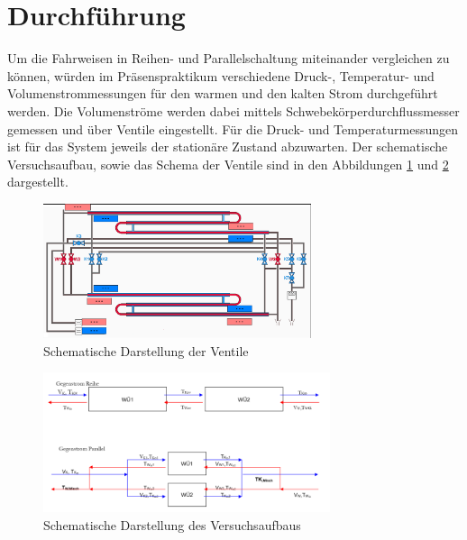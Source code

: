 
\section{Durchführung}
\label{sec:durchfuerung}

Um die Fahrweisen in Reihen- und Parallelschaltung miteinander vergleichen zu können, würden im Präsenspraktikum verschiedene Druck-, Temperatur- und Volumenstrommessungen für den warmen und den kalten Strom durchgeführt werden. Die Volumenströme werden dabei mittels Schwebekörperdurchflussmesser gemessen und über Ventile eingestellt.  Für die Druck- und Temperaturmessungen ist für das System jeweils der stationäre Zustand abzuwarten.
Der schematische Versuchsaufbau, sowie das Schema der Ventile sind in den Abbildungen \ref{fig:schema} und \ref{fig:schema1} dargestellt.
\vspace{2mm}

\begin{figure}[h!]
	\centering
	\includegraphics[width=0.7\textwidth]{img/schema}
	\caption{Schematische Darstellung der Ventile}
	\label{fig:schema}
\end{figure}
\FloatBarrier
\begin{figure}[h!]
	\centering
	\includegraphics[width=0.75\textwidth]{img/schema1}
	\caption{Schematische Darstellung des Versuchsaufbaus}
	\label{fig:schema1}
\end{figure}
\FloatBarrier
